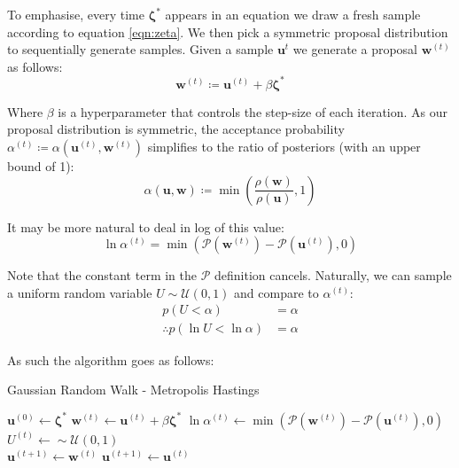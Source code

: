 \documentclass[]{article}
\newcommand{\ubold}{\boldsymbol{u}}
\newcommand{\wbold}{\boldsymbol{w}}
\newcommand{\zetabold}{\boldsymbol{\zeta^*}}
\newcommand{\Rho}{\mathcal{P}}
\begin{document}
To emphasise, every time $\zetabold$ appears in an equation we draw a fresh sample according to equation \ref{eqn:zeta}. We then pick a symmetric proposal distribution to sequentially generate samples. Given a sample $\ubold^{t}$ we generate a proposal $\wbold^{(t)}$ as follows:
%
\begin{equation}
	\wbold^{(t)} \coloneqq \ubold^{(t)} + \beta \zetabold
\end{equation}

Where $\beta$ is a hyperparameter that controls the step-size of each iteration. As our proposal distribution is symmetric, the acceptance probability $\alpha^{(t)} \coloneqq \alpha(\ubold^{(t)}, \wbold^{(t)})$ simplifies to the ratio of posteriors (with an upper bound of 1):
%
\begin{equation}
	\alpha(\ubold, \wbold) \coloneqq \min \left( \frac{\rho(\wbold)}{\rho(\ubold)}, 1 \right)
\end{equation}

It may be more natural to deal in log of this value:
%
\begin{equation}
	\ln \alpha^{(t)} = \min \left(\Rho(\wbold^{(t)}) - \Rho(\ubold^{(t)}), 0\right)
\end{equation}

Note that the constant term in the $\Rho$ definition cancels. Naturally, we can sample a uniform random variable $U \sim \mathcal{U}(0, 1)$ and compare to $\alpha^{(t)}$:
%
\begin{align}
	p(U < \alpha) &= \alpha \nonumber \\
	\therefore p(\ln U < \ln \alpha) &= \alpha
\end{align}

As such the algorithm goes as follows:
%
\begin{algorithm}
	\caption{Gaussian Random Walk - Metropolis Hastings}
	\label{alg:grw-mh}
\begin{algorithmic}
	\State $\ubold^{(0)} \gets \zetabold$
	\State $\wbold^{(t)} \gets \ubold^{(t)} + \beta \zetabold$ 
	\State $\ln \alpha^{(t)} \gets \min \left(\Rho(\wbold^{(t)}) - \Rho(\ubold^{(t)}), 0\right)$
	\State $U^{(t)} \gets \sim \mathcal{U}(0,1)$ \\
		\State $\ubold^{(t+1)} \gets \wbold^{(t)}$ 
	\Else
		\State $\ubold^{(t+1)} \gets \ubold^{(t)}$ 
	\EndIf
	\EndFor
\end{algorithmic}
\end{algorithm}
\end{document}
